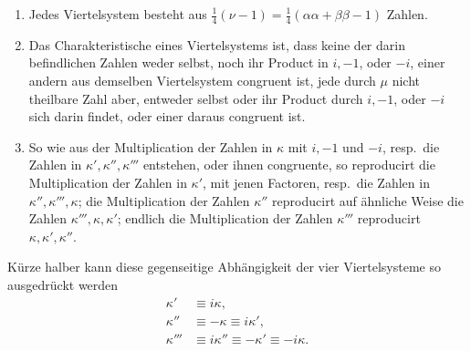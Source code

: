 \begin{enumerate}
\renewcommand{\labelenumi}{\arabic{enumi})}
\item Jedes Viertelsystem besteht aus $\frac14(\nu-1)=\frac14(\alpha\alpha+\beta\beta-1)$ Zahlen.
\item Das Charakteristische eines Viertelsystems ist, dass keine der darin befindlichen Zahlen weder selbst, noch ihr Product in $i,-1$, oder $-i$, einer andern aus demselben Viertelsystem congruent ist, jede durch $\mu$ nicht theilbare Zahl aber, entweder selbst oder ihr Product durch $i,-1$, oder $-i$ sich darin findet, oder einer daraus congruent ist.
\item So wie aus der Multiplication der Zahlen in $\kappa$ mit $i,-1$ und $-i$, resp.\ die Zahlen in $\kappa',\kappa'',\kappa'''$ entstehen, oder ihnen congruente, so reproducirt die Multiplication der Zahlen in $\kappa'$, mit jenen Factoren, resp.\ die Zahlen in $\kappa'',\kappa''',\kappa$; die Multiplication der Zahlen $\kappa''$ reproducirt auf ähnliche Weise die Zahlen $\kappa''',\kappa,\kappa'$; endlich die Multiplication der Zahlen $\kappa'''$ reproducirt $\kappa,\kappa',\kappa''$.
\end{enumerate}

Kürze halber kann diese gegenseitige Abhängigkeit der vier Viertelsysteme so ausgedrückt werden
\[
\begin{aligned}
\kappa'&\equiv i\kappa,\\
\kappa''&\equiv-\kappa\equiv i\kappa',\\
\kappa'''&\equiv i\kappa''\equiv-\kappa'\equiv-i\kappa.
\end{aligned}
\]
